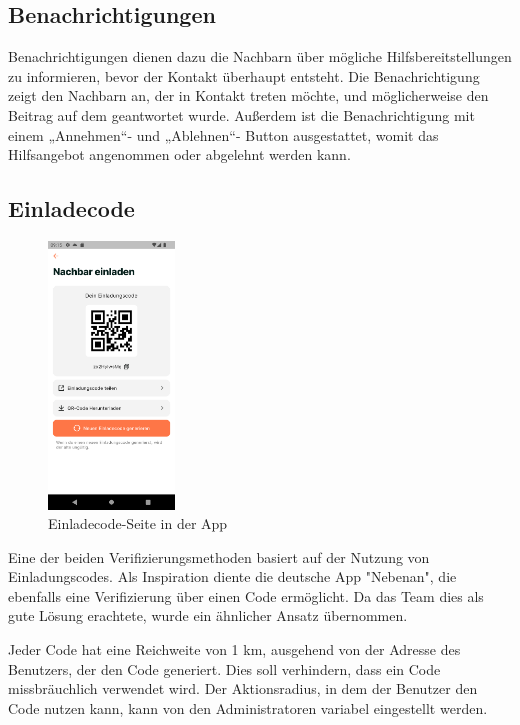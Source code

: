 \subsection{Benachrichtigungen}
Benachrichtigungen dienen dazu die Nachbarn über mögliche
Hilfsbereitstellungen zu informieren, bevor der Kontakt
überhaupt entsteht. Die Benachrichtigung zeigt den Nachbarn
an, der in Kontakt treten möchte, und möglicherweise den
Beitrag auf dem geantwortet wurde. Außerdem ist die
Benachrichtigung mit einem „Annehmen“- und „Ablehnen“-
Button ausgestattet, womit das Hilfsangebot angenommen oder
abgelehnt werden kann.

\subsection{Einladecode}

\begin{figure}[H]
  \centering
  \includegraphics[width=0.3\textwidth]{pics/einladecode-page.png}
  \caption{Einladecode-Seite in der App}
  \label{fig:einladecode}
\end{figure}
Eine der beiden Verifizierungsmethoden basiert auf der Nutzung von Einladungscodes. Als Inspiration diente die deutsche App "Nebenan", die ebenfalls eine Verifizierung über einen Code ermöglicht. Da das Team dies als gute Lösung erachtete, wurde ein ähnlicher Ansatz übernommen.

Jeder Code hat eine Reichweite von 1 km, ausgehend von der Adresse des Benutzers, der den Code generiert. Dies soll verhindern, dass ein Code missbräuchlich verwendet wird. Der Aktionsradius, in dem der Benutzer den Code nutzen kann, kann von den Administratoren variabel eingestellt werden.

